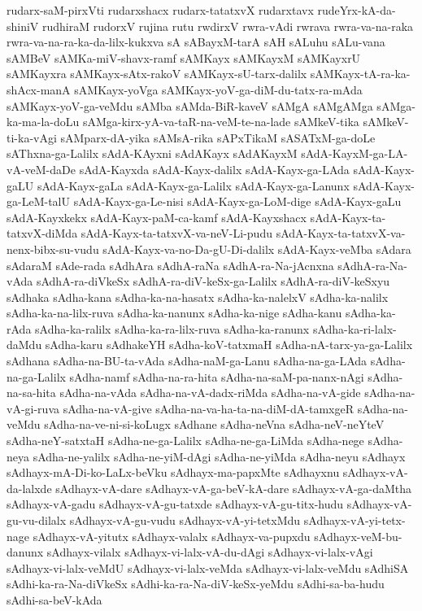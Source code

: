 {rudarx-saM-pirxVti
rudarxshacx
rudarx-tatatxvX
rudarxtavx
rudeYrx-kA-da-shiniV
rudhiraM
rudorxV
rujina
rutu
rwdirxV
rwra-vAdi
rwrava
rwra-va-na-raka
rwra-va-na-ra-ka-da-lilx-kukxva
sA
sABayxM-tarA
sAH
sALuhu
sALu-vana
sAMBeV
sAMKa-miV-shavx-ramf
sAMKayx
sAMKayxM
sAMKayxrU
sAMKayxra
sAMKayx-sAtx-rakoV
sAMKayx-sU-tarx-dalilx
sAMKayx-tA-ra-ka-shAcx-manA
sAMKayx-yoVga
sAMKayx-yoV-ga-diM-du-tatx-ra-mAda
sAMKayx-yoV-ga-veMdu
sAMba
sAMda-BiR-kaveV
sAMgA
sAMgAMga
sAMga-ka-ma-la-doLu
sAMga-kirx-yA-va-taR-na-veM-te-na-lade
sAMkeV-tika
sAMkeV-ti-ka-vAgi
sAMparx-dA-yika
sAMsA-rika
sAPxTikaM
sASATxM-ga-doLe
sAThxna-ga-Lalilx
sAdA-KAyxni
sAdAKayx
sAdAKayxM
sAdA-KayxM-ga-LA-vA-veM-daDe
sAdA-Kayxda
sAdA-Kayx-dalilx
sAdA-Kayx-ga-LAda
sAdA-Kayx-gaLU
sAdA-Kayx-gaLa
sAdA-Kayx-ga-Lalilx
sAdA-Kayx-ga-Lanunx
sAdA-Kayx-ga-LeM-talU
sAdA-Kayx-ga-Le-nisi
sAdA-Kayx-ga-LoM-dige
sAdA-Kayx-gaLu
sAdA-Kayxkekx
sAdA-Kayx-paM-ca-kamf
sAdA-Kayxshacx
sAdA-Kayx-ta-tatxvX-diMda
sAdA-Kayx-ta-tatxvX-va-neV-Li-pudu
sAdA-Kayx-ta-tatxvX-va-nenx-bibx-su-vudu
sAdA-Kayx-va-no-Da-gU-Di-dalilx
sAdA-Kayx-veMba
sAdara
sAdaraM
sAde-rada
sAdhAra
sAdhA-raNa
sAdhA-ra-Na-jAcnxna
sAdhA-ra-Na-vAda
sAdhA-ra-diVkeSx
sAdhA-ra-diV-keSx-ga-Lalilx
sAdhA-ra-diV-keSxyu
sAdhaka
sAdha-kana
sAdha-ka-na-hasatx
sAdha-ka-nalelxV
sAdha-ka-nalilx
sAdha-ka-na-lilx-ruva
sAdha-ka-nanunx
sAdha-ka-nige
sAdha-kanu
sAdha-ka-rAda
sAdha-ka-ralilx
sAdha-ka-ra-lilx-ruva
sAdha-ka-ranunx
sAdha-ka-ri-lalx-daMdu
sAdha-karu
sAdhakeYH
sAdha-koV-tatxmaH
sAdha-nA-tarx-ya-ga-Lalilx
sAdhana
sAdha-na-BU-ta-vAda
sAdha-naM-ga-Lanu
sAdha-na-ga-LAda
sAdha-na-ga-Lalilx
sAdha-namf
sAdha-na-ra-hita
sAdha-na-saM-pa-nanx-nAgi
sAdha-na-sa-hita
sAdha-na-vAda
sAdha-na-vA-dadx-riMda
sAdha-na-vA-gide
sAdha-na-vA-gi-ruva
sAdha-na-vA-give
sAdha-na-va-ha-ta-na-diM-dA-tamxgeR
sAdha-na-veMdu
sAdha-na-ve-ni-si-koLugx
sAdhane
sAdha-neVna
sAdha-neV-neYteV
sAdha-neY-satxtaH
sAdha-ne-ga-Lalilx
sAdha-ne-ga-LiMda
sAdha-nege
sAdha-neya
sAdha-ne-yalilx
sAdha-ne-yiM-dAgi
sAdha-ne-yiMda
sAdha-neyu
sAdhayx
sAdhayx-mA-Di-ko-LaLx-beVku
sAdhayx-ma-papxMte
sAdhayxnu
sAdhayx-vA-da-lalxde
sAdhayx-vA-dare
sAdhayx-vA-ga-beV-kA-dare
sAdhayx-vA-ga-daMtha
sAdhayx-vA-gadu
sAdhayx-vA-gu-tatxde
sAdhayx-vA-gu-titx-hudu
sAdhayx-vA-gu-vu-dilalx
sAdhayx-vA-gu-vudu
sAdhayx-vA-yi-tetxMdu
sAdhayx-vA-yi-tetx-nage
sAdhayx-vA-yitutx
sAdhayx-valalx
sAdhayx-va-pupxdu
sAdhayx-veM-bu-danunx
sAdhayx-vilalx
sAdhayx-vi-lalx-vA-du-dAgi
sAdhayx-vi-lalx-vAgi
sAdhayx-vi-lalx-veMdU
sAdhayx-vi-lalx-veMda
sAdhayx-vi-lalx-veMdu
sAdhiSA
sAdhi-ka-ra-Na-diVkeSx
sAdhi-ka-ra-Na-diV-keSx-yeMdu
sAdhi-sa-ba-hudu
sAdhi-sa-beV-kAda
}
